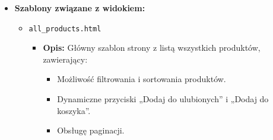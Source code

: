 \documentclass[12pt,a4paper,oneside]{article}
\theoremstyle{definition}
\numberwithin{equation}{section}
\begin{document}
\begin{itemize}
    \item \textbf{Szablony związane z widokiem:}
        \begin{itemize}
            \item \texttt{all\_products.html}
            \begin{itemize}
                \item \textbf{Opis:} Główny szablon strony z listą wszystkich produktów, zawierający:
                \begin{itemize}
                    \item Możliwość filtrowania i sortowania produktów.
                    \item Dynamiczne przyciski „Dodaj do ulubionych” i „Dodaj do koszyka”.
                    \item Obsługę paginacji.
                \end{itemize}
            \end{itemize}
        \end{itemize}


\end{itemize}
\end{document}
